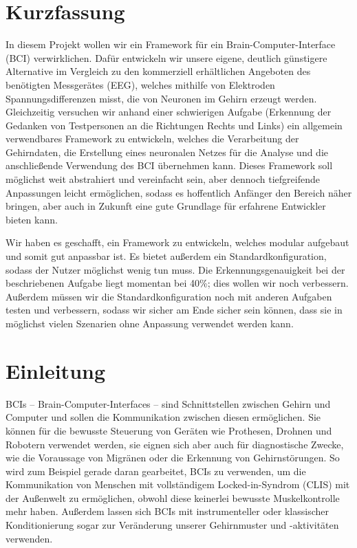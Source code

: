 \documentclass[10pt]{article}
\begin{document}
\section*{Kurzfassung}
In diesem Projekt wollen wir ein Framework für ein Brain-Computer-Interface (BCI) verwirklichen. 
Dafür entwickeln wir unsere eigene, deutlich günstigere Alternative im Vergleich zu den kommerziell erhältlichen Angeboten des benötigten Messgerätes (EEG), welches mithilfe von Elektroden Spannungsdifferenzen misst, die von Neuronen im Gehirn erzeugt werden. 
Gleichzeitig versuchen wir anhand einer schwierigen Aufgabe (Erkennung der Gedanken von Testpersonen an die Richtungen Rechts und Links) ein allgemein verwendbares Framework zu entwickeln, welches die Verarbeitung der Gehirndaten, die Erstellung eines neuronalen Netzes für die Analyse und die anschließende Verwendung des BCI übernehmen kann. 
Dieses Framework soll möglichst weit abstrahiert und vereinfacht sein, aber dennoch tiefgreifende Anpassungen leicht ermöglichen, sodass es hoffentlich Anfänger den Bereich näher bringen, aber auch in Zukunft eine gute Grundlage für erfahrene Entwickler bieten kann.

Wir haben es geschafft, ein Framework zu entwickeln, welches modular aufgebaut und somit gut anpassbar ist. Es bietet außerdem ein Standardkonfiguration, sodass der Nutzer möglichst wenig tun muss.
Die Erkennungsgenauigkeit bei der beschriebenen Aufgabe liegt momentan bei 40\%; dies wollen wir noch verbessern.
Außerdem müssen wir die Standardkonfiguration noch mit anderen Aufgaben testen und verbessern, sodass wir sicher am Ende sicher sein können, dass sie in möglichst vielen Szenarien ohne Anpassung verwendet werden kann.

\newpage

\pagestyle{fancy}
\fancyhead{}
\fancyhead[L]{\rightmark}

\section{Einleitung}
BCIs -- Brain-Computer-Interfaces -- sind Schnittstellen zwischen Gehirn und Computer und sollen die Kommunikation zwischen diesen ermöglichen.
Sie können für die bewusste Steuerung von Geräten wie Prothesen, Drohnen und Robotern verwendet werden, sie eignen sich aber auch für diagnostische Zwecke, wie die Voraussage von Migränen oder die Erkennung von Gehirnstörungen.
So wird zum Beispiel gerade daran gearbeitet, BCIs zu verwenden, um die Kommunikation von Menschen mit vollständigem Locked-in-Syndrom (CLIS) mit der Außenwelt zu ermöglichen, obwohl diese keinerlei bewusste Muskelkontrolle mehr haben. \cite{BCIChaudhary}
Außerdem lassen sich BCIs mit instrumenteller oder klassischer Konditionierung sogar zur Veränderung unserer Gehirnmuster und -aktivitäten verwenden. \cite{BCIChaudhary}
\end{document}
